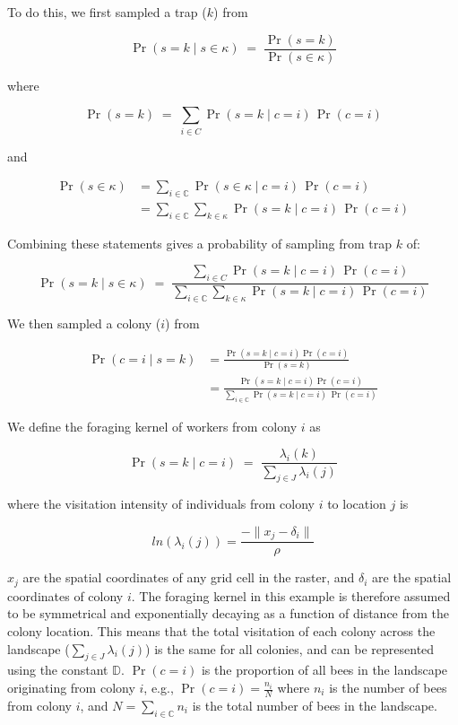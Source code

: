 \documentclass[12pt]{article}
\begin{document}
To do this, we first sampled a trap ($k$) from

\[
\Pr(s = k \mid s \in \kappa) \;=\; \frac{\Pr(s = k)}{\Pr(s \in \kappa)} \tag{1}
\]

where

\[
\Pr(s = k) \;=\; \sum_{i \in C} \Pr(s = k \mid c = i)\,\Pr(c = i)
\]

and

\begin{align*}
\Pr(s \in \kappa) 
    &= \sum_{i \in \mathbb{C}} \Pr(s \in \kappa \mid c = i)\,\Pr(c = i) \\[0.5em]
    &= \sum_{i \in \mathbb{C}} \sum_{k \in \kappa} \Pr(s = k \mid c = i)\,\Pr(c = i)
\end{align*}


Combining these statements gives a probability of sampling from trap $k$ of:

\[
\Pr(s = k \mid s \in \kappa) \;=\; \frac{\sum_{i \in C} \Pr(s = k \mid c = i)\,\Pr(c = i)}{\sum_{i \in \mathbb{C}} \sum_{k \in \kappa} \Pr(s = k \mid c = i)\,\Pr(c = i)} \tag{2}
\]

We then sampled a colony ($i$) from

\begin{align*}
\Pr(c = i \mid s = k)
  &= \frac{\Pr(s = k \mid c = i) \Pr(c = i)}{\Pr(s = k)} \\[0.5em]
  &= \frac{\Pr(s = k \mid c = i) \Pr(c = i)}{\sum_{i \in \mathbb{C}} \Pr(s = k \mid c = i)\,\Pr(c = i)} \tag{3}
\end{align*}


We define the foraging kernel of workers from colony $i$ as

\[
\Pr(s = k \mid c = i)
\;=\; 
\frac{\lambda_i(k)}{\sum_{j \in J} \lambda_i(j)} \tag{4}
\]

where the visitation intensity of individuals from colony $i$ to location $j$ is 

\[
ln(\lambda_i(j)) = \frac{- \lVert x_j - \delta_i \rVert}{\rho} \tag{5}
\]

$x_j$ are the spatial coordinates of any grid cell in the raster, and $\delta_i$ are the spatial coordinates of colony $i$. The foraging kernel in this example is therefore assumed to be symmetrical and exponentially decaying as a function of distance from the colony location. This means that the total visitation of each colony across the landscape ($\sum_{j \in J} \lambda_i(j)$) is the same for all colonies, and can be represented using the constant $\mathbb{D}$. $\Pr(c = i)$ is the proportion of all bees in the landscape originating from colony $i$, e.g., $\Pr(c = i) = \frac{n_i}{N}$ where $n_i$ is the number of bees from colony $i$, and $N = \sum_{i \in \mathbb{C}} n_i$ is the total number of bees in the landscape.
\end{document}
